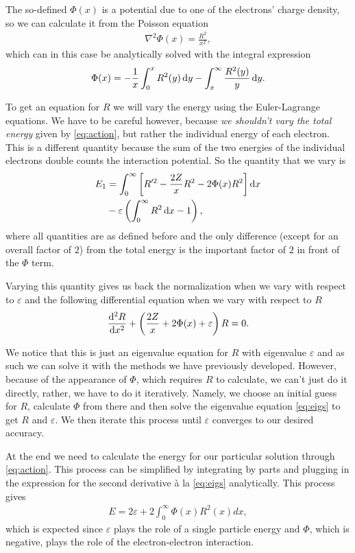 \documentclass[10pt,a4paper,twocolumn]{article}
\begin{document}
The so-defined $\Phi(x)$ is a potential due to one of the electrons' charge density, so we can calculate it from the Poisson equation
%
\begin{align}
    \nabla^2 \Phi(x) = \frac{R^2}{x^2},
\end{align}
%
which can in this case be analytically solved with the integral expression
%
\begin{align}
    \Phi(x) = -\frac{1}{x} \int_0^x R^2(y) \dif y - \int_x^{\infty} \frac{R^2(y)}{y} \dif y.
\end{align}

To get an equation for $R$ we will vary the energy using the Euler-Lagrange equations. We have to be careful however, because \emph{we shouldn't vary the total energy} given by \cref{eq:action}, but rather the individual energy of each electron. This is a different quantity because the sum of the two energies of the individual electrons double counts the interaction potential. So the quantity that we vary is
%
\begin{align}
    E_1 &= \int_0^{\infty} \left[ R'^2 - \frac{2 Z}{x}R^2 - 2 \Phi(x)R^2\right] \dif x\notag\\
    &-  \varepsilon \left( \int_0^{\infty} R^2 \dif x - 1 \right),
\end{align}
%
where all quantities are as defined before and the only difference (except for an overall factor of $2$) from the total energy is the important factor of $2$ in front of the $\Phi$ term.

Varying this quantity gives us back the normalization when we vary with respect to $\varepsilon$ and the following differential equation when we vary with respect to $R$
%
\begin{align}\label{eq:eigs}
    \frac{\mathrm{d}^2 R}{\dif x^2} + \left( \frac{2 Z}{x} + 2 \Phi(x) + \varepsilon \right) R = 0.
\end{align}

We notice that this is just an eigenvalue equation for $R$ with eigenvalue $\varepsilon$ and as such we can solve it with the methods we have previously developed. However, because of the appearance of $\Phi$, which requires $R$ to calculate, we can't just do it directly, rather, we have to do it iteratively. Namely, we choose an initial guess for $R$, calculate $\Phi$ from there and then solve the eigenvalue equation \cref{eq:eigs} to get $R$ and $\varepsilon$. We then iterate this process until $\varepsilon$ converges to our desired accuracy.


At the end we need to calculate the energy for our particular solution through \cref{eq:action}. This process can be simplified by integrating by parts and plugging in the expression for the second derivative à la \cref{eq:eigs} analytically. This process gives
%
\begin{align}
    E = 2 \varepsilon + 2 \int_0^{\infty} \Phi(x)R^2(x) dx,
\end{align}
%
which is expected since $\varepsilon$ plays the role of a single particle energy and $\Phi$, which is negative, plays the role of the electron-electron interaction.
\end{document}
